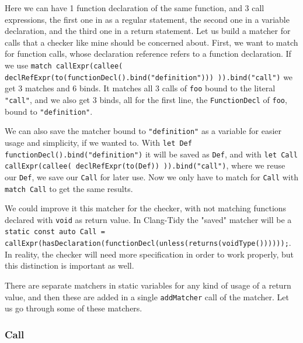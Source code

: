 Here we can have 1 function declaration of the same function, and 3 call expressions, the first one in as a regular statement, the second one in
a variable declaration, and the third one in a return statement. Let us build a matcher for calls that a checker like mine should be
concerned about.
First, we want to match for function calls, whose declaration reference refers to a function declaration. If we use
\texttt{match callExpr(callee( declRefExpr(to(functionDecl().bind("definition"))) )).bind("call")} we get 3 matches
and 6 binds. It matches all 3 calls of \texttt{foo} bound to the literal \texttt{"call"}, and we also get 3 binds, all for the
first line, the \texttt{FunctionDecl} of \texttt{foo}, bound to \texttt{"definition"}.

We can also save the matcher bound to \texttt{"definition"} as a variable for easier usage and simplicity, if we wanted to.
With \texttt{let Def functionDecl().bind("definition")} it will be saved as \texttt{Def}, and with
\texttt{let Call callExpr(callee( declRefExpr(to(Def)) )).bind("call")}, where we reuse our \texttt{Def}, we save our \texttt{Call} for later use. Now we only have
to match for \texttt{Call} with \texttt{match Call} to get the same results.

We could improve it this matcher for the checker, with not matching functions declared with \texttt{void} as return value.
In Clang-Tidy the "saved" matcher will be a
\texttt{static const auto Call = callExpr(hasDeclaration(functionDecl(unless(returns(voidType())))));}. In reality, the
checker will need more specification in order to work properly, but this distinction is important as well.

There are separate matchers in static variables for any kind of usage of a return value, and then these are added in a single
\texttt{addMatcher} call of the matcher. Let us go through some of these matchers.

\subsubsection{Call}

